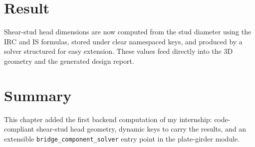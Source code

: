 \section{Result}
Shear-stud head dimensions are now computed from the stud diameter using the IRC and IS
formulas, stored under clear namespaced keys, and produced by a solver structured for easy
extension. These values feed directly into the 3D geometry and the generated design report.


\section{Summary}
This chapter added the first backend computation of my internship: code-compliant shear-stud
head geometry, dynamic keys to carry the results, and an extensible
\texttt{bridge\_component\_solver} entry point in the plate-girder module.
